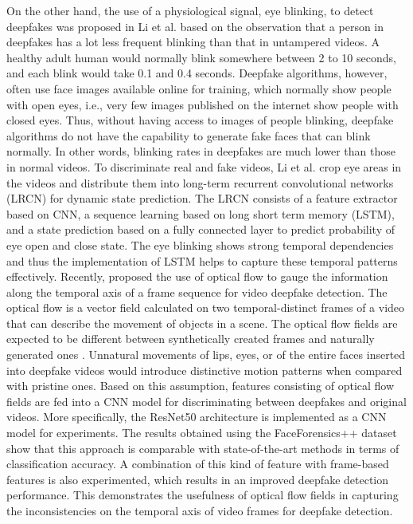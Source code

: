 On the other hand, the use of a physiological signal, eye blinking, to detect deepfakes was proposed in Li et al.  based on the observation that a person in deepfakes has a lot less frequent blinking than that in untampered videos. A healthy adult human would normally blink somewhere between 2 to 10 seconds, and each blink would take 0.1 and 0.4 seconds. Deepfake algorithms, however, often use face images available online for training, which normally show people with open eyes, i.e., very few images published on the internet show people with closed eyes. Thus, without having access to images of people blinking, deepfake algorithms do not have the capability to generate fake faces that can blink normally. In other words, blinking rates in deepfakes are much lower than those in normal videos. To discriminate real and fake videos, Li et al.  crop eye areas in the videos and distribute them into long-term recurrent convolutional networks (LRCN)  for dynamic state prediction. The LRCN consists of a feature extractor based on CNN, a sequence learning based on long short term memory (LSTM), and a state prediction based on a fully connected layer to predict probability of eye open and close state. The eye blinking shows strong temporal dependencies and thus the implementation of LSTM helps to capture these temporal patterns effectively.
Recently,  proposed the use of optical flow to gauge the information along the temporal axis of a frame sequence for video deepfake detection. The optical flow is a vector field calculated on two temporal-distinct frames of a video that can describe the movement of objects in a scene. The optical flow fields are expected to be different between synthetically created frames and naturally generated ones . Unnatural movements of lips, eyes, or of the entire faces inserted into deepfake videos would introduce distinctive motion patterns when compared with pristine ones. Based on this assumption, features consisting of optical flow fields are fed into a CNN model for discriminating between deepfakes and original videos. More specifically, the ResNet50 architecture  is implemented as a CNN model for experiments. The results obtained using the FaceForensics++ dataset  show that this approach is comparable with state-of-the-art methods in terms of classification accuracy. A combination of this kind of feature with frame-based features is also experimented, which results in an improved deepfake detection performance. This demonstrates the usefulness of optical flow fields in capturing the inconsistencies on the temporal axis of video frames for deepfake detection.

